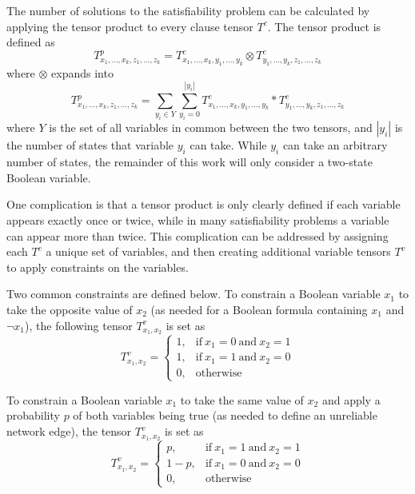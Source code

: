 \documentclass[12pt,twocolumn]{article}
\newcommand{\ten}{\fontsize{10pt}{\baselineskip}\selectfont}    %
\begin{document}
The number of solutions to the satisfiability problem can be calculated by applying the tensor product to every clause tensor \(T^c\). The tensor product is defined as \ten \[T^p_{x_1,...,x_k,z_1,...,z_k}=T^c_{x_1,...,x_k,y_1,...,y_k} \otimes T^c_{y_1,...,y_k,z_1,...,z_k}\] \normalsize where \(\otimes\) expands into \ten \[T^p_{x_1,...,x_k,z_1,...,z_k}=\sum_{y_i \in Y} \sum_{y_i=0}^{|y_i|} T^c_{x_1,...,x_k,y_1,...,y_k} * T^c_{y_1,...,y_k,z_1,...,z_k}\] \normalsize where \(Y\) is the set of all variables in common between the two tensors, and \(|y_i|\) is the number of states that variable \(y_i\) can take. While \(y_i\) can take an arbitrary number of states, the remainder of this work will only consider a two-state Boolean variable.

One complication is that a tensor product is only clearly defined if each variable appears exactly once or twice, while in many satisfiability problems a variable can appear more than twice. This complication can be addressed by assigning each \(T^c\) a unique set of variables, and then creating additional variable tensors \(T^v\) to apply constraints on the variables.

Two common constraints are defined below. To constrain a Boolean variable \(x_1\) to take the opposite value of \(x_2\) (as needed for a Boolean formula containing \(x_1\) and \(\neg x_1\)), the following tensor \(T^v_{x_1,x_2}\) is set as \begin{equation*}
T^v_{x_1,x_2}=
\begin{cases}
  1, & \text{if}\ x_1=0\ \text{and}\ x_2=1\\
  1, & \text{if}\ x_1=1\ \text{and}\ x_2=0\\
  0, & \text{otherwise}
\end{cases}
\end{equation*}

To constrain a Boolean variable \(x_1\) to take the same value of \(x_2\) and apply a probability \(p\) of both variables being true (as needed to define an unreliable network edge), the tensor \(T^v_{x_1,x_2}\) is set as \begin{equation*}
T^v_{x_1,x_2}=
\begin{cases}
    p, & \text{if}\ x_1=1\ \text{and}\ x_2=1 \\
    1-p, & \text{if}\ x_1=0\ \text{and}\ x_2=0 \\
    0, & \text{otherwise}
\end{cases}
\end{equation*}
\end{document}
